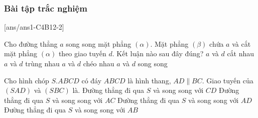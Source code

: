 \subsubsection{Bài tập trắc nghiệm}
[ans/ans1-C4B12-2]
\begin{ex}%
    Cho đường thẳng $a$ song song mặt phẳng $\left(\alpha\right)$. Mặt phẳng $\left(\beta\right)$ chứa $a$ và cắt mặt phẳng $\left(\alpha\right)$ theo giao tuyến $d$. Kết luận nào sau đây đúng?
    \choice
    {$a$ và $d$ cắt nhau}
    {$a$ và $d$ trùng nhau}
    {$a$ và $d$ chéo nhau}
    {\True $a$ và $d$ song song}
    \loigiai{}
\end{ex}

\begin{ex}%
    Cho hình chóp $S.ABCD$ có đáy $ABCD$ là hình thang, $AD\parallel BC$. Giao tuyến của $\left(SAD\right)$ và $\left(SBC\right)$ là.
    \choice
    {Đường thẳng đi qua $S$ và song song với $CD$}
    {Đường thẳng đi qua $S$ và song song với $AC$}
    {\True Đường thẳng đi qua $S$ và song song với $AD$}
    {Đường thẳng đi qua $S$ và song song với $AB$}
\end{ex}

